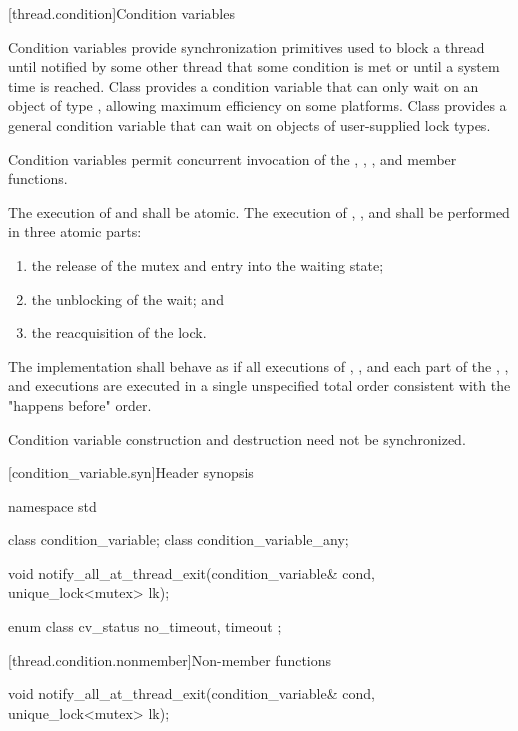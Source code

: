 [thread.condition]{Condition variables}

\pnum
Condition variables provide synchronization primitives used to block a thread until
notified by some other thread that some condition is met or until a system time is
reached. Class  provides a condition variable that can only
wait on an object of type , allowing maximum efficiency on some
platforms. Class  provides a general condition variable
that can wait on objects of user-supplied lock types.

\pnum
Condition variables permit concurrent invocation of the , ,
,  and  member functions.

\pnum
The execution of  and  shall be atomic. The
execution of , , and  shall be performed
in three atomic parts:

\begin{enumerate}
\item the release of the mutex and entry into the waiting state;
\item the unblocking of the wait; and
\item the reacquisition of the lock.
\end{enumerate}

\pnum
The implementation shall behave as if all executions of , , and each
part of the , , and  executions are
executed in a single unspecified total order consistent with the "happens before" order.

\pnum
Condition variable construction and destruction need not be synchronized.

[condition_variable.syn]{Header  synopsis}
%

%
\begin{codeblock}
namespace std {
  class condition_variable;
  class condition_variable_any;

  void notify_all_at_thread_exit(condition_variable& cond, unique_lock<mutex> lk);

  enum class cv_status { no_timeout, timeout };
}
\end{codeblock}

[thread.condition.nonmember]{Non-member functions}
%
\begin{itemdecl}
void notify_all_at_thread_exit(condition_variable& cond, unique_lock<mutex> lk);
\end{itemdecl}

